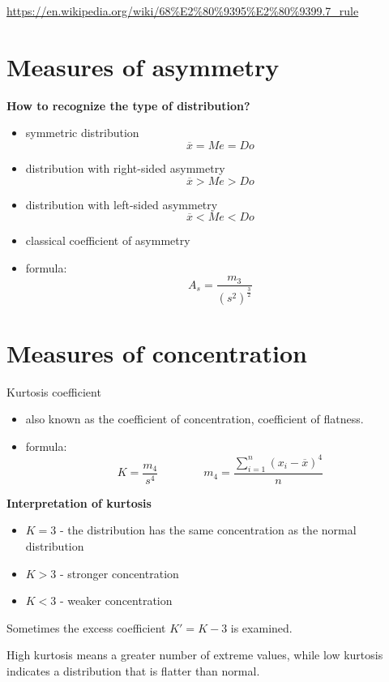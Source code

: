\documentclass[
  english,
  letterpaper,
  DIV=11,
  numbers=noendperiod]{scrreprt}
\providecommand{\tightlist}{%
  \setlength{\itemsep}{0pt}\setlength{\parskip}{0pt}}
\begin{document}
\url{https://en.wikipedia.org/wiki/68\%E2\%80\%9395\%E2\%80\%9399.7_rule}

\section{Measures of asymmetry}\label{measures-of-asymmetry}

\textbf{How to recognize the type of distribution?}

\begin{itemize}
\item
  symmetric distribution \[\overline{x} =Me=Do\]
\item
  distribution with right-sided asymmetry \[\overline{x} >Me>Do\]
\item
  distribution with left-sided asymmetry \[\overline{x}<Me<Do\]
\item
  classical coefficient of asymmetry
\item
  formula: \[A_s=\frac{m_3}{(s^2)^{\frac{3}{2}}}\]
\end{itemize}

\section{Measures of concentration}\label{measures-of-concentration}

Kurtosis coefficient

\begin{itemize}
\tightlist
\item
  also known as the coefficient of concentration, coefficient of
  flatness.
\item
  formula:
  \[K=\frac{m_4}{s^4} \qquad \qquad m_4=\frac{\sum\limits_{i=1}^n (x_i-\overline{x})^4}{n}\]
\end{itemize}

\textbf{Interpretation of kurtosis}

\begin{itemize}
\tightlist
\item
  \(K=3\) - the distribution has the same concentration as the normal
  distribution
\item
  \(K>3\) - stronger concentration
\item
  \(K<3\) - weaker concentration
\end{itemize}

Sometimes the excess coefficient \(K'=K-3\) is examined.

High kurtosis means a greater number of extreme values, while low
kurtosis indicates a distribution that is flatter than normal.
\end{document}
